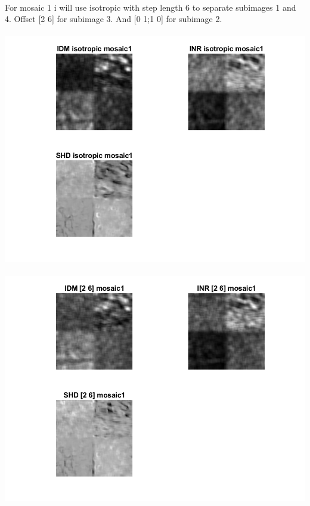 \documentclass[12pt, letterpaper, twoside]{article}
\begin{document}
\ \\  
For mosaic 1 i will use isotropic with step length 6 to separate subimages 1 and 4. Offset [2 6] for subimage 3. And [0 1;1 0] for subimage 2.\\
\ \\
\includegraphics[scale=1]{"m1[isotropic].png"}\\
\ \\
\includegraphics[scale=1]{"m1[26].png"}\\
\ \\
\end{document}
